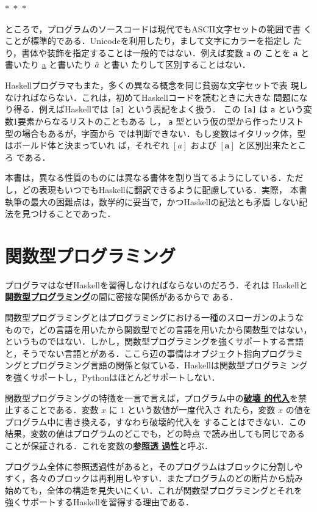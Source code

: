 \documentclass[a5paper,twoside,fleqn,draft]{jsbook}
\newcommand{\separator}{\begin{center}$*$~$*$~$*$\end{center}}
\newcommand{\programminglanguage}[1]{\textsf{#1}}
\newcommand{\haskell}{\programminglanguage{Haskell}}
\newcommand{\python}{\programminglanguage{Python}}
\newcommand{\keyword}[1]{{\underline{\textbf{#1}}}}
\newcommand{\code}[1]{\texttt{#1}}
\newcommand{\mType}[1]{\mathbf{#1}}
\newcommand{\mListType}[1]{[\mType{#1}]}
\newcommand{\mListWith}[1]{\left[#1\right]}
\begin{document}
\separator

ところで，プログラムのソースコードは現代でもASCII文字セットの範囲で書
くことが標準的である．Unicodeを利用したり，まして文字にカラーを指定し
たり，書体や装飾を指定することは一般的ではない．例えば変数 \code{a} の
ことを \textbf{a} と書いたり \underline{a} と書いたり $\Hat a$ と書い
たりして区別することはない．

\haskell プログラマもまた，多くの異なる概念を同じ貧弱な文字セットで表
現しなければならない．これは，初めて\haskell コードを読むときに大きな
問題になり得る．例えば\haskell では \code{[a]} という表記をよく扱う．
この \code{[a]} は \code{a} という変数1要素からなるリストのこともある
し， \code{a} 型という仮の型から作ったリスト型の場合もあるが，字面から
では判断できない．もし変数はイタリック体，型はボールド体と決まっていれ
ば，それぞれ $\mListWith{a}$ および $\mListType{a}$ と区別出来たところ
である．

本書は，異なる性質のものには異なる書体を割り当てるようにしている．ただ
し，どの表現もいつでも\haskell に翻訳できるように配慮している．実際，
本書執筆の最大の困難点は，数学的に妥当で，かつ\haskell の記法とも矛盾
しない記法を見つけることであった．

\section{関数型プログラミング}

プログラマはなぜ\haskell を習得しなければならないのだろう．それは
\haskell と\keyword{関数型プログラミング}の間に密接な関係があるからで
ある．

関数型プログラミングとはプログラミングにおける一種のスローガンのような
もので，どの言語を用いたから関数型でどの言語を用いたから関数型ではない，
というものではない．しかし，関数型プログラミングを強くサポートする言語
と，そうでない言語とがある．ここら辺の事情はオブジェクト指向プログラミ
ングとプログラミング言語の関係と似ている．\haskell は関数型プログラミ
ングを強くサポートし，\python はほとんどサポートしない．

関数型プログラミングの特徴を一言で言えば，プログラム中の\keyword{破壊
  的代入}を禁止することである．変数 $x$ に $1$ という数値が一度代入さ
れたら，変数 $x$ の値をプログラム中に書き換える，すなわち破壊的代入を
することはできない．この結果，変数の値はプログラムのどこでも，どの時点
で読み出しても同じであることが保証される．これを変数の\keyword{参照透
  過性}と呼ぶ．

プログラム全体に参照透過性があると，そのプログラムはブロックに分割しや
すく，各々のブロックは再利用しやすい．またプログラムのどの断片から読み
始めても，全体の構造を見失いにくい．これが関数型プログラミングとそれを
強くサポートする\haskell を習得する理由である．
\end{document}
